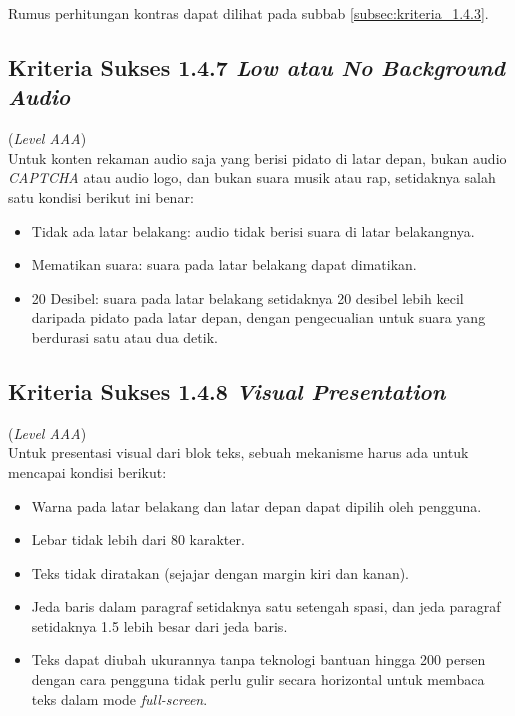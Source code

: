 Rumus perhitungan kontras dapat dilihat pada subbab \ref{subsec:kriteria_1.4.3}.

\subsection{Kriteria Sukses 1.4.7 \textit{Low atau No Background Audio}}
\label{subsec:kriteria_1.4.7}
(\textit{Level AAA}) \\

Untuk konten rekaman audio saja yang berisi pidato di latar depan, bukan audio \textit{CAPTCHA} atau audio logo, dan bukan suara musik atau rap, setidaknya salah satu kondisi berikut ini benar: 

\begin{itemize}
	\item Tidak ada latar belakang: audio tidak berisi suara di latar belakangnya.
	\item Mematikan suara: suara pada latar belakang dapat dimatikan.
	\item 20 Desibel: suara pada latar belakang setidaknya 20 desibel lebih kecil daripada pidato pada latar depan, dengan pengecualian untuk suara yang berdurasi satu atau dua detik.
\end{itemize}

\subsection{Kriteria Sukses 1.4.8 \textit{Visual Presentation}}
\label{subsec:kriteria_1.4.8}
(\textit{Level AAA}) \\

Untuk presentasi visual dari blok teks, sebuah mekanisme harus ada untuk mencapai kondisi berikut:

\begin{itemize}
	\item Warna pada latar belakang dan latar depan dapat dipilih oleh pengguna.
	\item Lebar tidak lebih dari 80 karakter.
	\item Teks tidak diratakan (sejajar dengan margin kiri dan kanan).
	\item Jeda baris dalam paragraf setidaknya satu setengah spasi, dan jeda paragraf setidaknya 1.5 lebih besar dari jeda baris.
	\item Teks dapat diubah ukurannya tanpa teknologi bantuan hingga 200 persen dengan cara pengguna tidak perlu gulir secara horizontal untuk membaca teks dalam mode \textit{full-screen}.
\end{itemize}


